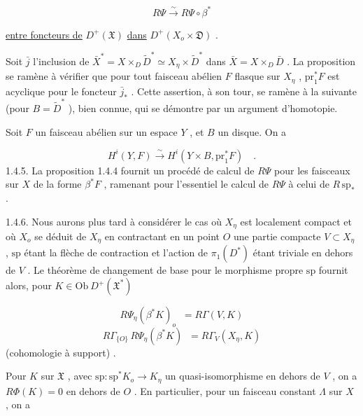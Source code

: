 \begin{equation*}
R\Psi \stackrel{\sim}{\longrightarrow} R\Psi \circ \beta^*
\end{equation*}


 \underline{entre foncteurs de} $D^+(\mathfrak{X})$ \underline{dans} $D^+(X_o \times \mathfrak{D})$ .

Soit $\bar{j}$ l'inclusion de $\bar{X}^* = X \times_D \widetilde{D}^* \simeq X_\eta \times \widetilde{D}^*$ dans $\bar{X} = X \times_D \bar{D}$ . La proposition se ramène à vérifier que pour tout faisceau abélien $F$ flasque sur $X_\eta$ , $\mathrm{pr}_1^* F$ est acyclique pour le foncteur $\bar{j}_*$ . Cette assertion, à son tour, se ramène à la suivante (pour $B = \widetilde{D}^*$ ), bien connue, qui se démontre par un argument d'homotopie.

Soit $F$ un faisceau abélien sur un espace $Y$ , et $B$ un disque. On a

\begin{equation*}
H^i(Y, F) \overset{\sim}{\longrightarrow} H^i(Y \times B, \mathrm{pr}_1^* F) \quad .
\end{equation*}
1.4.5. La proposition 1.4.4 fournit un procédé de calcul de $R\Psi$ pour les faisceaux sur $X$ de la forme $\beta^* F$ , ramenant pour l'essentiel le calcul de $R\Psi$ à celui de $R\, \mathrm{sp}_*$ .

1.4.6. Nous aurons plus tard à considérer le cas où $X_\eta$ est localement compact et où $X_o$ se déduit de $X_\eta$ en contractant en un point $O$ une partie compacte $V \subset X_\eta$ , $\mathrm{sp}$ étant la flèche de contraction et l'action de $\pi_1(D^*)$ étant triviale en dehors de $V$ . Le théorème de changement de base pour le morphisme propre $\mathrm{sp}$ fournit alors, pour $K \in \mathrm{Ob}\ D^+(\mathfrak{X}^*)$

\begin{equation}\tag{1.4.6.1}
R\Psi_\eta(\beta^* K)_o \;\; = R\Gamma (V, K)
\end{equation}
\begin{equation}\tag{1.4.6.2}
R\Gamma_{\{O\}} \, R\Psi_\eta(\beta^* K) \;\; = R\Gamma_V(X_\eta , K)
\end{equation}
(cohomologie à support) .

Pour $K$ sur $\mathfrak{X}$ , avec $\mathrm{sp} : \mathrm{sp}^* K_o \longrightarrow K_\eta$ un quasi-isomorphisme en dehors de $V$ , on a $R\Phi(K) = 0$ en dehors de $O$ . En particulier, pour un faisceau constant $\Lambda$ sur $X$ , on a

